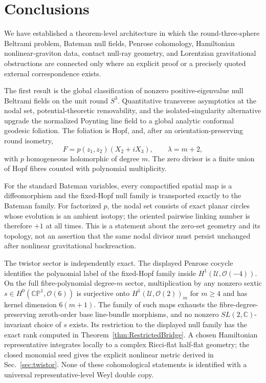 \documentclass[aps,prd,reprint,nofootinbib,superscriptaddress]{revtex4-2}
\theoremstyle{definition}
\theoremstyle{remark}
\newcommand{\C}{\mathbb{C}}
\newcommand{\CP}{\mathbb{CP}}
\begin{document}
\section{Conclusions}

We have established a theorem-level architecture in which the round-three-sphere Beltrami problem, Bateman null fields, Penrose cohomology, Hamiltonian nonlinear-graviton data, contact null-ray geometry, and Lorentzian gravitational obstructions are connected only where an explicit proof or a precisely quoted external correspondence exists.

The first result is the global classification of nonzero positive-eigenvalue null Beltrami fields on the unit round $S^3$.  Quantitative transverse asymptotics at the nodal set, potential-theoretic removability, and the isolated-singularity alternative upgrade the normalized Poynting line field to a global analytic conformal geodesic foliation.  The foliation is Hopf, and, after an orientation-preserving round isometry,
\begin{equation}
 F=p(z_1,z_2)(X_2+iX_3),\qquad \lambda=m+2,
 \label{eq:ConclusionBeltrami}
\end{equation}
with $p$ homogeneous holomorphic of degree $m$.  The zero divisor is a finite union of Hopf fibres counted with polynomial multiplicity.

For the standard Bateman variables, every compactified spatial map is a diffeomorphism and the fixed-Hopf null family is transported exactly to the Bateman family.  For factorized $p$, the nodal set consists of exact planar circles whose evolution is an ambient isotopy; the oriented pairwise linking number is therefore $+1$ at all times.  This is a statement about the zero-set geometry and its topology, not an assertion that the same nodal divisor must persist unchanged after nonlinear gravitational backreaction.

The twistor sector is independently exact.  The displayed Penrose cocycle identifies the polynomial label of the fixed-Hopf family inside $H^1(\mathcal U,\mathcal O(-4))$.  On the full fibre-polynomial degree-$m$ sector, multiplication by any nonzero sextic $s\in H^0(\CP^1,\mathcal O(6))$ is surjective onto $H^1(\mathcal U,\mathcal O(2))_m$ for $m\ge4$ and has kernel dimension $6(m+1)$.  The family of such maps exhausts the fibre-degree-preserving zeroth-order base line-bundle morphisms, and no nonzero $SL(2,\C)$-invariant choice of $s$ exists.  Its restriction to the displayed null family has the exact rank computed in Theorem~\ref{thm:RestrictedBridge}.  A chosen Hamiltonian representative integrates locally to a complex Ricci-flat half-flat geometry; the closed monomial seed gives the explicit nonlinear metric derived in Sec.~\ref{sec:twistor}.  None of these cohomological statements is identified with a universal representative-level Weyl double copy.
\end{document}
